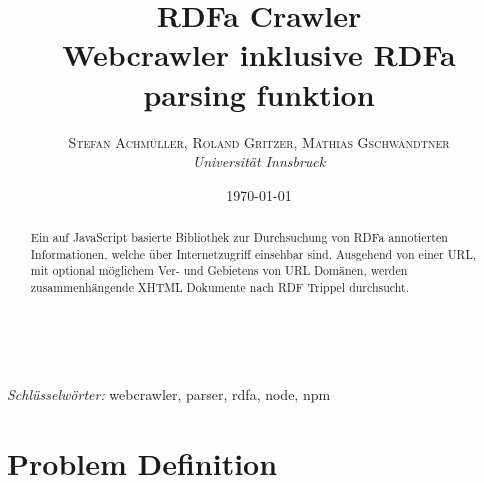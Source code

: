 \documentclass[hidelinks, a4paper, 11pt]{article} %
\title{\textbf{RDFa Crawler}\\ %
Webcrawler inklusive RDFa parsing funktion} %
\author{\textsc{Stefan Achm\"uller, Roland Gritzer, Mathias Gschwandtner} %
\\{\textit{Universit\"at Innsbruck}}} %
\date{\today} %
\makeatletter
\renewcommand{\maketitle}{ %
\begin{flushright} %
{\LARGE\@title} %

\vspace{50pt} %

{\large\@author} %
\\\@date %

\vspace{40pt} %
\end{flushright}
}
\makeatother
\begin{document}
\maketitle %



\renewcommand{\abstractname}{Zusammenfassung} %

\begin{abstract}
Ein auf JavaScript basierte Bibliothek zur Durchsuchung von RDFa annotierten Informationen, welche \"uber Internetzugriff einsehbar sind. Ausgehend von einer URL, mit optional m\"oglichem Ver- und Gebietens von URL Dom\"anen, werden zusammenh\"angende XHTML Dokumente nach RDF Trippel durchsucht.
\end{abstract}

\hspace*{3,6mm}\textit{Schl\"usselw\"orter:} webcrawler, parser, rdfa, node, npm %

\vspace{30pt} %

\renewcommand{\contentsname}{Inhaltsangabe}

\tableofcontents
\newpage





\section{Problem Definition}
\end{document}
